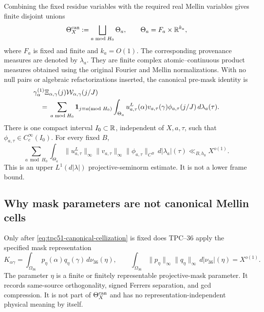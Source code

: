 Combining the fixed residue variables with the required real Mellin
variables gives finite disjoint unions
\begin{equation}
 \Theta^{\rm can}_X
 :=\bigsqcup_{a\bmod H_0}\Theta_a,
 \qquad
 \Theta_a=F_a\times\mathbb R^{k_a},
 \label{eq:tpc51-canonical-parameter-space}
\end{equation}
where $F_a$ is fixed and finite and $k_a=O(1)$.  The corresponding
provenance measures are denoted by $\lambda_a$.  They are finite complex
atomic--continuous product measures obtained using the original Fourier and
Mellin normalizations.  With no null pairs or algebraic refactorizations
inserted, the canonical pre-mask identity is
\begin{align}
 &\gamma_\alpha^{(1)}
  \Xi_{\alpha,\gamma}(j)
  \mathcal W_{\alpha,\gamma}(j/J)
 \notag\\
 &\quad={}
 \sum_{a\bmod H_0}\mathbf 1_{j\equiv a\!\!\!\pmod{H_0}}
 \int_{\Theta_a}
 u_{a,\tau}^{L}(\alpha)v_{a,\tau}(\gamma)
 \phi_{a,\tau}(j/J)\,d\lambda_a(\tau).
 \label{eq:tpc51-canonical-cellization}
\end{align}
There is one compact interval $I_0\subset\mathbb R$, independent of $X,a,\tau$,
such that $\phi_{a,\tau}\in C_c^\infty(I_0)$.  For every fixed $B$,
\begin{equation}
 \sum_{a\bmod H_0}\int_{\Theta_a}
 \|u_{a,\tau}^{L}\|_\infty
 \|v_{a,\tau}\|_\infty
 \|\phi_{a,\tau}\|_{C^B}\,d|\lambda_a|(\tau)
 \ll_{B,h_0}X^{o(1)}.
 \label{eq:tpc51-canonical-L1-seminorm-mass}
\end{equation}
This is an upper $L^1(d|\lambda|)$ projective-seminorm estimate.  It is not
a lower frame bound.

\subsection{Why mask parameters are not canonical Mellin cells}

Only after \eqref{eq:tpc51-canonical-cellization} is fixed does TPC--36
apply the specified mask representation
\begin{equation}
 K_{\alpha\gamma}
 =\int_{\Omega_{36}}p_\eta(\alpha)q_\eta(\gamma)
 \,d\nu_{36}(\eta),
 \qquad
 \int_{\Omega_{36}}
 \|p_\eta\|_\infty\|q_\eta\|_\infty\,d|\nu_{36}|(\eta)
 =X^{o(1)}.
 \label{eq:tpc51-specified-mask-representation}
\end{equation}
The parameter $\eta$ is a finite or finitely representable projective-mask
parameter.  It records same-source orthogonality, signed Ferrers separation,
and gcd compression.  It is not part of
$\Theta_X^{\rm can}$ and has no representation-independent physical
meaning by itself.

